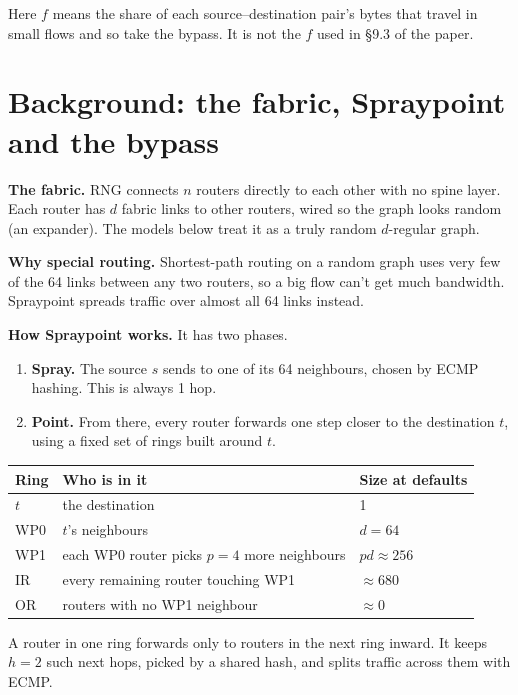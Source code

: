\documentclass[11pt]{article}
\begin{document}
Here $f$ means the share of each source--destination pair's bytes that travel in small flows and so take the bypass. It is not the $f$ used in §9.3 of the paper.

\section*{Background: the fabric, Spraypoint and the bypass}

\textbf{The fabric.} RNG connects $n$ routers directly to each other with no spine layer. Each router has $d$ fabric links to other routers, wired so the graph looks random (an expander). The models below treat it as a truly random $d$-regular graph.

\textbf{Why special routing.} Shortest-path routing on a random graph uses very few of the 64 links between any two routers, so a big flow can't get much bandwidth. Spraypoint spreads traffic over almost all 64 links instead.

\textbf{How Spraypoint works.} It has two phases.
\begin{enumerate}
  \item \textbf{Spray.} The source $s$ sends to one of its 64 neighbours, chosen by ECMP hashing. This is always 1 hop.
  \item \textbf{Point.} From there, every router forwards one step closer to the destination $t$, using a fixed set of rings built around $t$.
\end{enumerate}

\begin{center}
\begin{tabular}{@{}lll@{}}
\toprule
Ring & Who is in it & Size at defaults \\
\midrule
$t$ & the destination & 1 \\
WP0 & $t$'s neighbours & $d = 64$ \\
WP1 & each WP0 router picks $p = 4$ more neighbours & $p d \approx 256$ \\
IR & every remaining router touching WP1 & $\approx 680$ \\
OR & routers with no WP1 neighbour & $\approx 0$ \\
\bottomrule
\end{tabular}
\end{center}

A router in one ring forwards only to routers in the next ring inward. It keeps $h = 2$ such next hops, picked by a shared hash, and splits traffic across them with ECMP.
\end{document}
